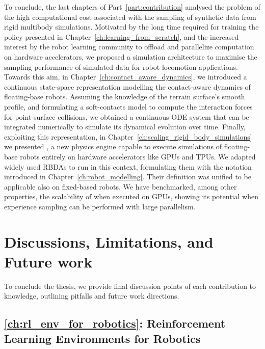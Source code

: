 To conclude, the last chapters of Part~\ref{part:contribution} analysed the problem of the high computational cost associated with the sampling of synthetic data from rigid multibody simulations.
Motivated by the long time required for training the policy presented in Chapter~\ref{ch:learning_from_scratch}, and the increased interest by the robot learning community to offload and parallelize computation on hardware accelerators, we proposed a simulation architecture to maximise the sampling performance of simulated data for robot locomotion applications.
Towards this aim, in Chapter~\ref{ch:contact_aware_dynamics}, we introduced a continuous state-space representation modelling the contact-aware dynamics of floating-base robots.
Assuming the knowledge of the terrain surface's smooth profile, and formulating a soft-contacts model to compute the interaction forces for point-surface collisions, we obtained a continuous \acs{ODE} system that can be integrated numerically to simulate its dynamical evolution over time.
Finally, exploiting this representation, in Chapter~\ref{ch:scaling_rigid_body_simulations} we presented \jaxsim, a new physics engine capable to execute simulations of floating-base robots entirely on hardware accelerators like \acsp{GPU} and \acsp{TPU}.
We adapted widely used \aclp{RBDA} to run in this context, formulating them with the notation introduced in Chapter~\ref{ch:robot_modelling}.
Their definition was unified to be applicable also on fixed-based robots.
We have benchmarked, among other properties, the scalability of \jaxsim when executed on \acp{GPU}, showing its potential when experience sampling can be performed with large parallelism.

\section*{Discussions, Limitations, and Future work}

To conclude the thesis, we provide final discussion points of each contribution to knowledge, outlining pitfalls and future work directions.

\subsection*{\autoref{ch:rl_env_for_robotics}: Reinforcement Learning Environments for Robotics}

